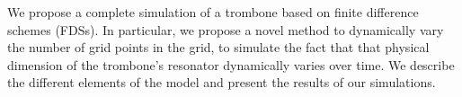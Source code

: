 We propose a complete simulation of a trombone based on finite difference schemes (FDSs). In particular, we propose a novel method to dynamically vary the number of grid points in the grid, to simulate the fact that that physical dimension of the trombone's resonator dynamically varies over time.
We describe the different elements of the model and present the results of our simulations. 